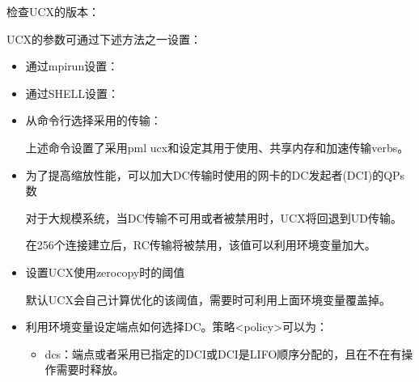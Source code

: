 \documentclass[a4paper,12pt,english]{sphinxmanual}
\begin{document}
\sphinxAtStartPar
{}

\sphinxAtStartPar
检查UCX的版本：

\sphinxAtStartPar
{}

\sphinxAtStartPar
UCX的参数可通过下述方法之一设置：
\begin{itemize}
\item {} 
\sphinxAtStartPar
通过mpirun设置：

\sphinxAtStartPar
{}

\item {} 
\sphinxAtStartPar
通过SHELL设置：

\sphinxAtStartPar
{}

\sphinxAtStartPar
{}

\item {} 
\sphinxAtStartPar
从命令行选择采用的传输：

\sphinxAtStartPar
{}

\sphinxAtStartPar
上述命令设置了采用pml ucx和设定其用于使用、共享内存和加速传输verbs。

\item {} 
\sphinxAtStartPar
为了提高缩放性能，可以加大DC传输时使用的网卡的DC发起者(DCI)的QPs数

\sphinxAtStartPar
{}

\sphinxAtStartPar
对于大规模系统，当DC传输不可用或者被禁用时，UCX将回退到UD传输。

\sphinxAtStartPar
在256个连接建立后，RC传输将被禁用，该值可以利用环境变量加大。

\item {} 
\sphinxAtStartPar
设置UCX使用zero\sphinxhyphen{}copy时的阈值

\sphinxAtStartPar
{}

\sphinxAtStartPar
默认UCX会自己计算优化的该阈值，需要时可利用上面环境变量覆盖掉。

\item {} 
\sphinxAtStartPar
利用环境变量设定端点如何选择DC。策略<policy>可以为：
\begin{itemize}
\item {} 
\sphinxAtStartPar
dcs：端点或者采用已指定的DCI或DCI是LIFO顺序分配的，且在不在有操作需要时释放。


\end{itemize}
\end{itemize}
\end{document}
